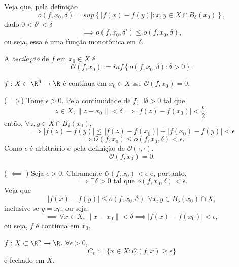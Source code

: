 \begin{remark}
    Veja que, pela definição \[
    o\left( f,x_0,\delta \right) = sup \left\{ \left| f\left( x \right) -f\left( y \right)  \right| : x,y \in  X\cap B_\delta \left( x_0 \right)  \right\} 
    ,\] dado $0<\delta'<\delta$ \[
    \implies o\left( f,x_0,\delta' \right) \le o\left( f,x_0,\delta \right)
    ,\] ou seja, essa é uma função monotônica em $\delta$.
\end{remark}

\begin{definition}
    A \emph{oscilação} de $f$ em $x_0\in X$ é \[
    \mathcal{O}\left( f,x_0 \right) := inf \left\{ o\left( f, x_0,\delta \right): \delta>0 \right\}
    .\] 
\end{definition}

\begin{prop}
    $f: X\subset \R^{n}\to \R$ é contínua em $x_0 \in X$ sse $\mathcal{O}\left( f, x_0 \right) =0$.
\end{prop}

\begin{demo}
    ($\implies$)
    Tome $\epsilon>0$. Pela continuidade de $f$, $\exists \delta > 0$ tal que \[
	z\in X, \|z-x_0\|<\delta \implies \left| f\left( z \right) -f\left( x_0 \right)\right|  < \frac{\epsilon}{2} 
    ,\] então, $\forall z,y \in  X \cap B_\delta\left( x_0 \right) $, \[
    \implies \left| f\left( z \right) -f\left( y \right)  \right| \le  \left| f\left( z \right) -f\left( x_0 \right)  \right| + \left| f\left( x_0 \right) -f\left( y \right)  \right| < \epsilon
    \] \[
    \implies \mathcal{O}\left( f, x_0 \right) \le o\left( f, x_0, \delta \right) <  \epsilon
    .\] Como $\epsilon$ é arbitrário e pela definição de $\mathcal{O}\left( \cdot , \cdot  \right) $, \[
    \mathcal{O}\left( f, x_0 \right) = 0
    .\] 

    ( $\impliedby $ ) 
    Seja $\epsilon>0$. Claramente $\mathcal{O}\left( f,x_0 \right) <\epsilon$ e, portanto,  \[
    \implies\exists \delta>0 \text{ tal que } o\left( f,x_0,\delta \right) < \epsilon
    .\] Veja que \[
    \left| f\left( x \right) -f\left( y \right)  \right| \le o\left(  f,x_0,\delta\right) , \forall x,y \in B_{\delta}\left( x_0 \right) \cap X
    ,\] inclusive se $y=x_0$, ou seja, \[
    \implies \forall x\in X, \|x-x_0\| < \delta \implies \left| f\left( x \right) -f\left( x_0 \right)  \right| <\epsilon
    ,\] ou seja, $f$ é contínua em $x_0$.
\end{demo}

\begin{prop}
    $f:X\subset \R^{n}\to \R$. $\forall \epsilon>0$, \[
    C_{\epsilon} := \{x\in X : \mathcal{O}\left( f, x \right) \ge \epsilon\} 
    \] é fechado em $X$.
\end{prop}


